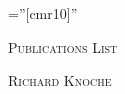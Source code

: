 \documentclass[a4paper,10pt]{article}
\begin{document}

\pagestyle{empty} %

\font\fb=''[cmr10]'' %

\par{\centering
		{\Huge \textsc{Publications List}
	}\par}
	\centering \textsc{Richard Knoche}
	 \bigskip

\end{document}
